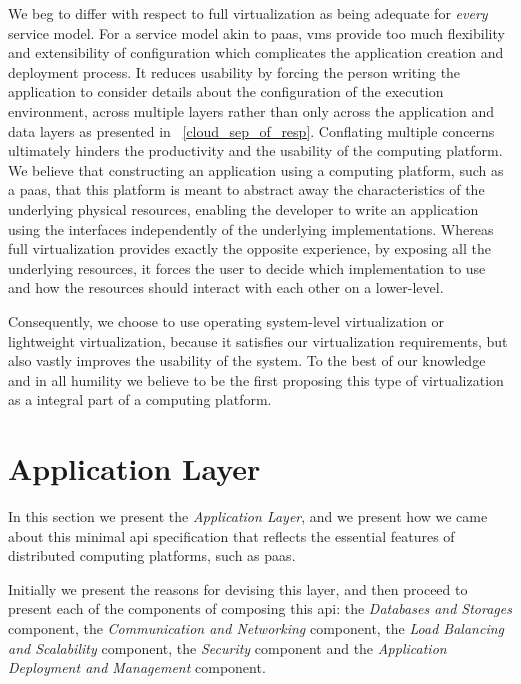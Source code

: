 \documentclass[12pt, titlepage]{uo_temp}
\begin{document}
     We beg to differ with respect to full virtualization as being adequate for
     \emph{every} service model. For a service model akin to \gls{paas}, \gls{vm}s provide
     too much flexibility and extensibility of configuration which complicates the
     application creation and deployment process. It reduces usability by forcing the
     person writing the application to consider details about the configuration of the
     execution environment, across multiple layers rather than only across the application
     and data layers as presented in ~\ref{cloud_sep_of_resp}. Conflating multiple
     concerns ultimately hinders the productivity and the usability of the computing
     platform. We believe that constructing an application using a computing platform,
     such as a \gls{paas}, that this platform is meant to abstract away the
     characteristics of the underlying physical resources, enabling the developer to write
     an application using the interfaces independently of the underlying
     implementations. Whereas full virtualization provides exactly the opposite
     experience, by exposing all the underlying resources, it forces the user to decide
     which implementation to use and how the resources should interact with each other on
     a lower-level.

     Consequently, we choose to use operating system-level virtualization or lightweight
     virtualization, because it satisfies our virtualization requirements, but also vastly
     improves the usability of the system. To the best of our knowledge and in all
     humility we believe to be the first proposing this type of virtualization as a
     integral part of a computing platform.
    
     \section{Application Layer}
     In this section we present the \emph{Application Layer}, and we present how we came
     about this minimal \gls{api} specification that reflects the essential features of
     distributed computing platforms, such as \gls{paas}. 

     Initially we present the reasons for devising this layer, and then proceed to present
     each of the components of composing this \gls{api}: the \emph{Databases and Storages}
     component, the \emph{Communication and Networking} component, the \emph{Load
       Balancing and Scalability} component, the \emph{Security} component and the
     \emph{Application Deployment and Management} component.
     
\end{document}

